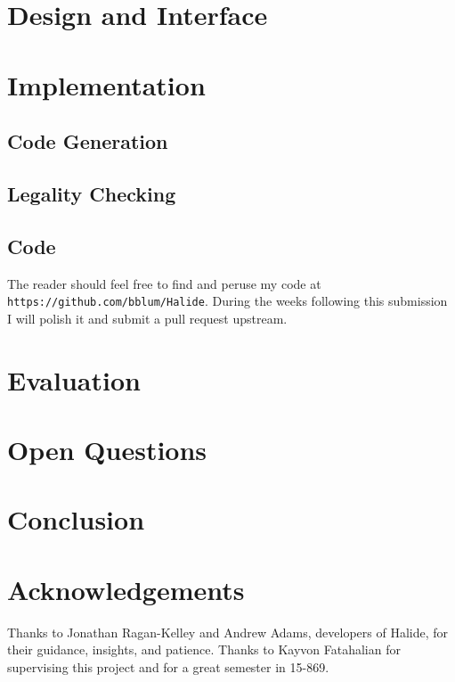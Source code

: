 \documentclass{article}
\begin{document}
\section{Design and Interface}

\section{Implementation}

\subsection{Code Generation}

\subsection{Legality Checking}

\subsection{Code}

The reader should feel free to find and peruse my code at \texttt{https://github.com/bblum/Halide}. During the weeks following this submission I will polish it and submit a pull request upstream.

\section{Evaluation}

\section{Open Questions}

\section{Conclusion}

\section*{Acknowledgements}

Thanks to Jonathan Ragan-Kelley and Andrew Adams, developers of Halide, for their guidance, insights, and patience. Thanks to Kayvon Fatahalian for supervising this project and for a great semester in 15-869.

{}

\end{document}
